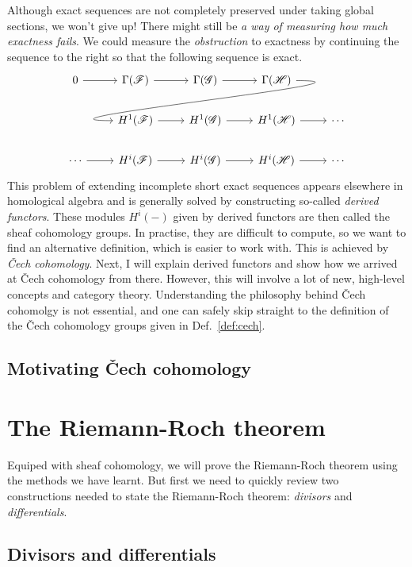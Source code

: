 \documentclass[12pt]{article}
\begin{document}
Although exact sequences are not completely preserved under taking
global sections, we won't give up! There might still be \emph{a way of
measuring how much exactness fails}. We could measure the
\emph{obstruction} to exactness by continuing the sequence to the right
so that the following sequence is exact.
\[
\begin{tikzcd}
  0 \arrow{r} & \Gamma(\mathscr{F}) \arrow{r} & \Gamma(\mathscr{G})
  \arrow{r} & \Gamma(\mathscr{H})
  \arrow[out=0, in=180, looseness=1.5, overlay]{dll} & \\
    & H^{1}(\mathscr{F}) \arrow{r} & H^{1}(\mathscr{G})
  \arrow{r} & H^{1}(\mathscr{H}) \arrow{r} & \cdots \\
  \cdots \arrow{r}& H^{i}(\mathscr{F}) \arrow{r} & H^{i}(\mathscr{G})
  \arrow{r} & H^{i}(\mathscr{H}) \arrow{r} & \cdots
\end{tikzcd}
\]
This problem of extending incomplete short exact sequences appears
elsewhere in homological algebra and is generally solved by constructing
so-called \emph{derived functors}. These modules $H^{i}(-)$ given by derived
functors are then called the sheaf cohomology groups. In practise, they are
difficult to compute, so we want to find an alternative definition,
which is easier to work with. This is achieved by \emph{\v Cech cohomology}.
Next, I will explain derived functors and show how we arrived at \v Cech
cohomology from there. However, this will involve a lot of new, high-level
concepts and category theory. Understanding the philosophy behind
\v Cech cohomolgy is not essential, and one can safely skip straight to the
definition of the \v Cech cohomology groups given in Def.~\ref{def:cech}.

\subsection{Motivating \v Cech cohomology}

\section{The Riemann-Roch theorem}
Equiped with sheaf cohomology, we will prove the Riemann-Roch theorem
using the methods we have learnt. But first we need to quickly review
two constructions needed to state the Riemann-Roch theorem: \emph{divisors}
and \emph{differentials}.

\subsection{Divisors and differentials}
\end{document}

